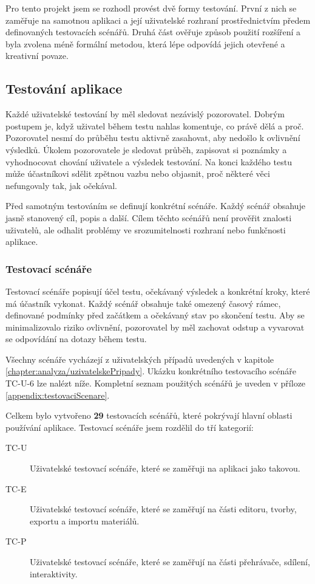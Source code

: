 Pro tento projekt jsem se rozhodl provést dvě formy testování.
První z nich se zaměřuje na samotnou aplikaci a její uživatelské rozhraní prostřednictvím předem definovaných testovacích scénářů. 
Druhá část ověřuje způsob použití rozšíření a byla zvolena méně formální metodou, která lépe odpovídá jejich otevřené a kreativní povaze.

\subsection{Testování aplikace}

Každé uživatelské testování by měl sledovat nezávislý pozorovatel. 
Dobrým postupem je, když uživatel během testu nahlas komentuje, co právě dělá a proč. 
Pozorovatel nesmí do průběhu testu aktivně zasahovat, aby nedošlo k ovlivnění výsledků. 
Úkolem pozorovatele je sledovat průběh, zapisovat si poznámky a vyhodnocovat chování uživatele a výsledek testování. 
Na konci každého testu může účastníkovi sdělit zpětnou vazbu nebo objasnit, proč některé věci nefungovaly tak, jak očekával.

Před samotným testováním se definují konkrétní scénáře.
Každý scénář obsahuje jasně stanovený cíl, popis a další. 
Cílem těchto scénářů není prověřit znalosti uživatelů, ale odhalit problémy ve srozumitelnosti rozhraní nebo funkčnosti aplikace.

\subsubsection{Testovací scénáře}

Testovací scénáře popisují účel testu, očekávaný výsledek a konkrétní kroky, které má účastník vykonat.
Každý scénář obsahuje také omezený časový rámec, definované podmínky před začátkem a očekávaný stav po skončení testu. 
Aby se minimalizovalo riziko ovlivnění, pozorovatel by měl zachovat odstup a vyvarovat se odpovídání na dotazy během testu.

Všechny scénáře vycházejí z uživatelských případů uvedených v kapitole \ref{chapter:analyza/uzivatelskePripady}.
Ukázku konkrétního testovacího scénáře TC-U-6 lze nalézt níže. 
Kompletní seznam použitých scénářů je uveden v příloze \ref{appendix:testovaciScenare}.

Celkem bylo vytvořeno \textbf{29} testovacích scénářů, které pokrývají hlavní oblasti používání aplikace.
Testovací scénáře jsem rozdělil do tří kategorií:

\begin{description}
    \item[TC-U] Uživatelské testovací scénáře, které se zaměřuji na aplikaci jako takovou. 
    \item[TC-E] Uživatelské testovací scénáře, které se zaměřují na části editoru, tvorby, exportu a importu materiálů.
    \item[TC-P] Uživatelské testovací scénáře, které se zaměřují na části přehrávače, sdílení, interaktivity.
\end{description}


